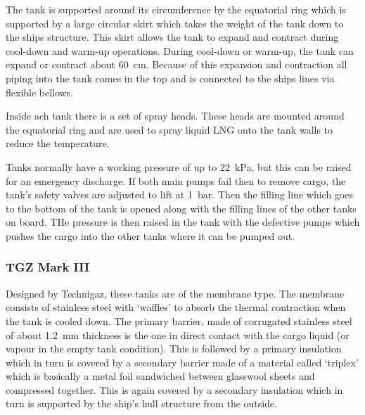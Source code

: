 The tank is supported around its circumference by the equatorial ring which is supported by a large circular skirt which takes the weight of the tank down to the ships structure. This skirt allows the tank to expand and contract during cool-down and warm-up operations. During cool-down or warm-up, the tank can expand or contract about \SI{60}{\centi\meter}. Because of this expansion and contraction all piping into the tank comes in the top and is connected to the ships lines via flexible bellows.

Inside ach tank there is a set of spray heads. These heads are mounted around the equatorial ring and are used to spray liquid LNG onto the tank walls to reduce the temperature.

Tanks normally have a working pressure of up to \SI{22}{\kilo\pascal}, but this can be raised for an emergency discharge. If both main pumps fail then to remove cargo, the tank's safety valves are adjusted to lift at \SI{1}{bar}. Then the filling line which goes to the bottom of the tank is opened along with the filling lines of the other tanks on board. THe pressure is then raised in the tank with the defective pumps which pushes the cargo into the other tanks where it can be pumped out.
\subsubsection{TGZ Mark III}
Designed by Technigaz, these tanks are of the membrane type. The membrane consists of stainless steel with `waffles' to absorb the thermal contraction when the tank is cooled down. The primary barrier, made of corrugated stainless steel of about \SI{1.2}{\milli\meter} thickness is the one in direct contact with the cargo liquid (or vapour in the empty tank condition). This is followed by a primary insulation which in turn is covered by a secondary barrier made of a material called `triplex' which is basically a metal foil sandwiched between glasswool sheets and compressed together. This is again covered by a secondary insulation which in turn is supported by the ship's hull structure from the outside.

